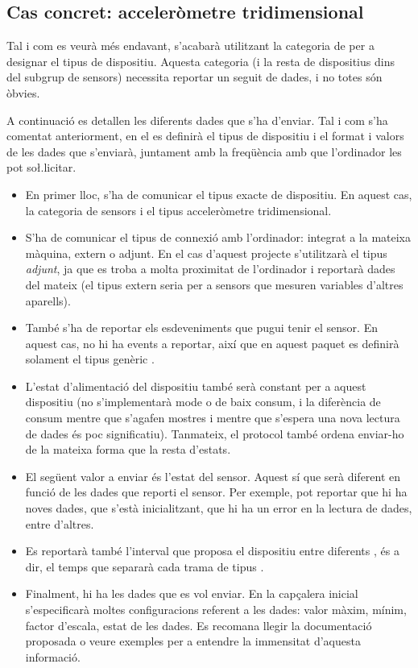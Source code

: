 \subsection{Cas concret: acceleròmetre tridimensional}

Tal i com es veurà més endavant, s'acabarà utilitzant la categoria de
 per a designar el tipus de dispositiu. Aquesta
categoria (i la resta de dispositius dins del subgrup de sensors) necessita
reportar un seguit de dades, i no totes són òbvies.

A continuació es detallen les diferents dades que s'ha d'enviar. Tal i com s'ha
comentat anteriorment, en el  es definirà
el tipus de dispositiu i el format i valors de les dades que s'enviarà, juntament
amb la freqüència amb que l'ordinador les pot so\l.licitar.

\begin{itemize}
    \item En primer lloc, s'ha de comunicar el tipus exacte de dispositiu. En
    aquest cas, la categoria de sensors i el tipus acceleròmetre tridimensional.
    \item S'ha de comunicar el tipus de connexió amb l'ordinador: integrat a
    la mateixa màquina, extern o adjunt. En el cas d'aquest projecte s'utilitzarà
    el tipus \emph{adjunt}, ja que es troba a molta proximitat de l'ordinador
    i reportarà dades del mateix (el tipus extern seria per a sensors que
    mesuren variables d'altres aparells).
    \item També s'ha de reportar els esdeveniments que pugui tenir el sensor.
    En aquest cas, no hi ha events a reportar, així que en aquest paquet
    es definirà solament el tipus genèric .
    \item L'estat d'alimentació del dispositiu també serà constant per a
    aquest dispositiu (no s'implementarà mode  o de baix consum, i
    la diferència de consum mentre que s'agafen mostres i mentre que
    s'espera una nova lectura de dades és poc significatiu). Tanmateix, el
    protocol també ordena enviar-ho de la mateixa forma que la resta d'estats.
    \item El següent valor a enviar és l'estat del sensor. Aquest sí que serà
    diferent en funció de les dades que reporti el sensor. Per exemple, pot
    reportar que hi ha noves dades, que s'està inicialitzant, que hi ha un
    error en la lectura de dades, entre d'altres.
    \item Es reportarà també l'interval que proposa el dispositiu entre
    diferents , és a dir, el temps que separarà cada trama de
    tipus .
    \item Finalment, hi ha les dades que es vol enviar. En la capçalera inicial
    s'especificarà moltes configuracions referent a les dades: valor màxim,
    mínim, factor d'escala, estat de les dades. Es recomana llegir la
    documentació proposada o veure exemples per a entendre la immensitat
    d'aquesta informació.
\end{itemize}

